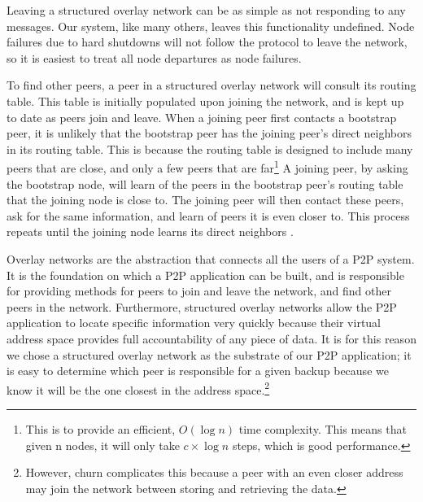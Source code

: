 \documentclass[12pt]{report}
\begin{document}
Leaving a structured overlay network can be as simple as not responding to any messages. Our system, like many others, leaves this functionality undefined. Node failures due to hard shutdowns will not follow the protocol to leave the network, so it is easiest to treat all node departures as node failures. 

To find other peers, a peer in a structured overlay network will consult its routing table. This table is initially populated upon joining the network, and is kept up to date as peers join and leave. When a joining peer first contacts a bootstrap peer, it is unlikely that the bootstrap peer has the joining peer's direct neighbors in its routing table. This is because the routing table is designed to include many peers that are close, and only a few peers that are far\footnote{This is to provide an efficient, $O(\log n)$ time complexity. This means that given n nodes, it will only take $c \times \log n$ steps, which is good performance.} A joining peer, by asking the bootstrap node, will learn of the peers in the bootstrap peer's routing table that the joining node is close to. The joining peer will then contact these peers, ask for the same information, and learn of peers it is even closer to. This process repeats until the joining node learns its direct neighbors \cite{p2pSurvey}.

Overlay networks are the abstraction that connects all the users of a P2P system. It is the foundation on which a P2P application can be built, and is responsible for providing methods for peers to join and leave the network, and find other peers in the network. Furthermore, structured overlay networks allow the P2P application to locate specific information very quickly because their virtual address space provides full accountability of any piece of data. It is for this reason we chose a structured overlay network as the substrate of our P2P application; it is easy to determine which peer is responsible for a given backup because we know it will be the one closest in the address space.\footnote{However, churn complicates this because a peer with an even closer address may join the network between storing and retrieving the data.}

\end{document}
